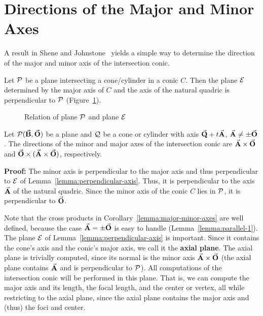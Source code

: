 \section{Directions of the Major and Minor Axes}
\label{section:determining-axes}

A result in Shene and Johnstone~\cite{shene:1991} 
yields a simple way to determine the direction of the 
major and minor axis of the intersection conic.  

\begin{lemma}
\label{lemma:perpendicular-axis}
    Let ${\cal P}$ be a plane intersecting a cone/cylinder in a conic 
$C$.  Then the plane ${\cal E}$ determined by the major axis of $C$ and the 
axis of the natural quadric is perpendicular to ${\cal P}$
(Figure~\ref{fig:perpendicular-stuff}).
\end{lemma}

\begin{figure}
\vspace{4cm}
\caption{Relation of plane ${\cal P}$ and plane ${\cal E}$}
\label{fig:perpendicular-stuff}
\end{figure}

\begin{corollary}
\label{lemma:major-minor-axes}
    Let ${\cal P}(\vec{\bf B},\vec{\bf O})$ be a plane 
and ${\cal Q}$ be a cone or cylinder with axis $\vec{\bf Q}+t\vec{\bf A}$,
$\vec{\bf A}\neq\pm\vec{\bf O}$.
The directions of the minor
and major axes of the intersection conic are $\vec{\bf A}\times\vec{\bf O}$ and 
$\vec{\bf O}\times(\vec{\bf A}\times\vec{\bf O})$, respectively.  
\end{corollary}
{\bf Proof:}
The minor axis is perpendicular to the major axis and thus perpendicular
to ${\cal E}$ of Lemma~\ref{lemma:perpendicular-axis}.
Thus, it is perpendicular to the axis $\vec{\bf A}$ of the natural quadric.
Since the minor axis of the conic $C$ lies in ${\cal P}$,
it is perpendicular to $\vec{\bf O}$.
\QED

Note that the cross products in Corollary~\ref{lemma:major-minor-axes} are 
well defined, because the case $\vec{\bf A}=\pm\vec{\bf O}$ is easy to handle
(Lemma~\ref{lemma:parallel-1}).
The plane ${\cal E}$ of Lemma~\ref{lemma:perpendicular-axis} is important.
Since it contains the cone's axis and the conic's major axis,
we call it the {\bf axial plane}.
The axial plane is trivially computed, since its normal is the minor axis 
$\vec{\bf A}\times\vec{\bf O}$ (the axial plane contains $\vec{\bf A}$
and is perpendicular to ${\cal P}$).
All computations of the intersection conic will be performed in this plane.
That is, we can compute the major axis and its length, the focal length,
and the center or vertex, all while restricting to the axial plane,
since the axial plane contains the major axis and (thus) the foci and center.

